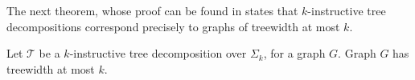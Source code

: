 The next theorem, whose proof can be found in \cite{From2023} states that $k$-instructive tree decompositions correspond precisely to graphs of treewidth at most $k$. 

\begin{theorem}
    Let $\mathcal{T}$ be a $k$-instructive tree decomposition over $\Sigma_k$, for a graph $G$. Graph $G$ has treewidth at most $k$.
\end{theorem}








